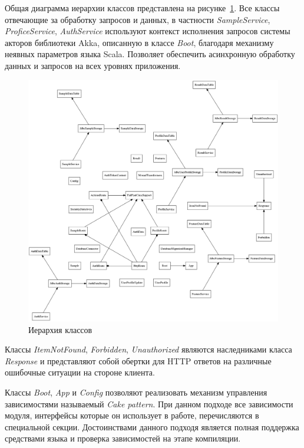 Общая диаграмма иерархии классов представлена на рисунке~\ref{fig:develoipment:class_fdp}. Все классы отвечающие за обработку запросов и данных, в частности \emph{SampleService}, \emph{ProficeService}, \emph{AuthService} используют контекст исполнения запросов системы акторов библиотеки Akka, описанную в классе \emph{Boot}, благодаря механизму неявных параметров языка Scala. Позволяет обеспечить асинхронную обработку данных и запросов на всех уровнях приложения.

\begin{figure}[ht]
    \centering
    \includegraphics[width=1\textwidth]{figures/classes-fdp.png}
    \caption{Иерархия классов}
    \label{fig:develoipment:class_fdp}
\end{figure}

Классы \emph{ItemNotFound}, \emph{Forbidden}, \emph{Unauthorized} являются наследниками класса \emph{Response} и представляют собой обертки для HTTP ответов на различные ошибочные ситуации на стороне клиента.

Классы \emph{Boot}, \emph{App} и \emph{Config} позволяют реализовать механизм управления зависимостями называемый \emph{Cake pattern}. При данном подходе все зависимости модуля, интерфейсы которые он использует в работе, перечисляются в специальной секции. Достоинствами данного подходя является полная поддержка средствами языка и проверка зависимостей на этапе компиляции.


